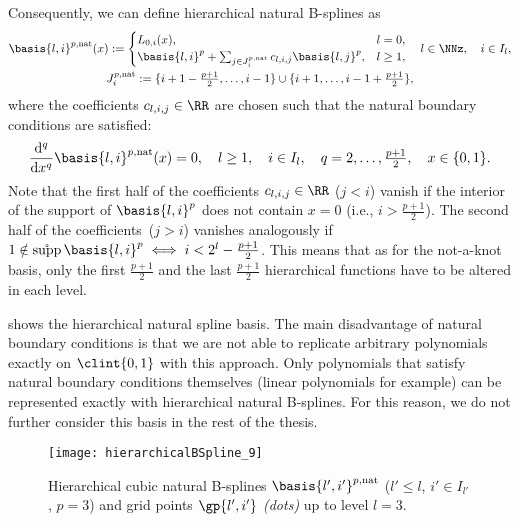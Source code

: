 %
Consequently, we can define hierarchical natural B-splines as
\begin{subequations}
  \begin{gather}
    \basis{l,i}^{p,\ntrl}(x)
    :=
    \begin{cases}
      L_{0,i}(x),&
      l = 0,\\
      \basis{l,i}^p +
      \sum_{j \in J_i^{p,\ntrl}} c_{l,i,j} \basis{l,j}^p,&
      l \ge 1,
    \end{cases}\quad
    l \in \NNz,\quad
    i \in I_l,\\
    J_i^{p,\ntrl}
    := \{i+1-\tfrac{p+1}{2}, \dotsc, i-1\} \cup
    \{i+1, \dotsc, i-1+\tfrac{p+1}{2}\},
  \end{gather}
\end{subequations}
where the coefficients $c_{l,i,j} \in \RR$ are chosen such that
the natural boundary conditions are satisfied:
\begin{equation}
  \frac{\diff^q}{\dx^q} \basis{l,i}^{p,\ntrl}(x)
  = 0,\quad
  l \ge 1,\quad
  i \in I_l,\quad
  q = 2, \dotsc, \tfrac{p+1}{2},\quad
  x \in \{0, 1\}.
\end{equation}
%
Note that the first half of the coefficients $c_{l,i,j} \in \RR$
($j < i$) vanish if the interior of the support of $\basis{l,i}^p$
does not contain $x = 0$
(i.e., $i > \tfrac{p+1}{2}$).
The second half of the coefficients~($j > i$) vanishes analogously
if $1 \notin \intsupp \basis{l,i}^p \iff i < 2^l - \tfrac{p+1}{2}$.
This means that as for the not-a-knot basis,
only the first $\tfrac{p+1}{2}$ and the last $\tfrac{p+1}{2}$
hierarchical functions have to be altered in each level.

 shows the hierarchical natural spline basis.
The main disadvantage of natural boundary conditions is that
we are not able to replicate arbitrary polynomials exactly on $\clint{0, 1}$
with this approach.
Only polynomials that satisfy natural boundary conditions themselves
(linear polynomials for example)
can be represented exactly with hierarchical natural B-splines.
For this reason, we do not further consider this basis in the
rest of the thesis.

\begin{SCfigure}
  \texttt{[image: hierarchicalBSpline\_9]}%
  \caption{%
    Hierarchical cubic natural B-splines
    $\basis{l',i'}^{p,\ntrl}$
    ($l' \le l$, $i' \in I_{l'}$, $p = 3$) and
    grid points $\gp{l',i'}$ \emph{(dots)} up to level $l = 3$.%
  }%
  \label{fig:naturalBSpline}%
\end{SCfigure}
